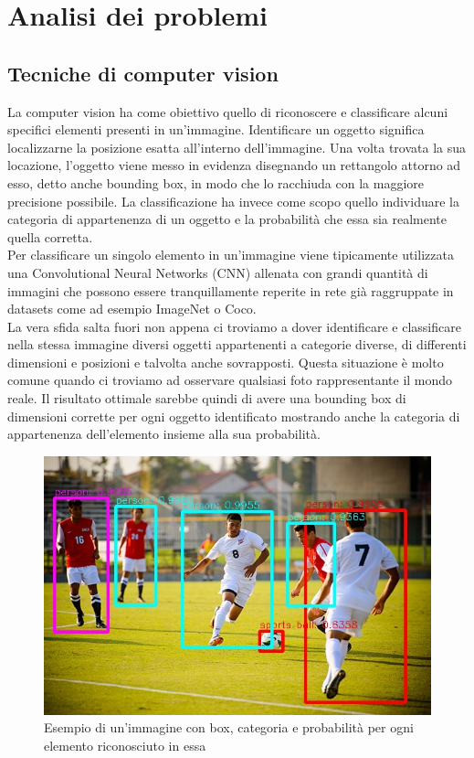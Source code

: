 \section{Analisi dei problemi}
\subsection{Tecniche di computer vision}
La computer vision ha come obiettivo quello di riconoscere e classificare alcuni specifici elementi presenti in un'immagine. Identificare un oggetto significa localizzarne la posizione esatta all'interno dell'immagine. Una volta trovata la sua locazione, l'oggetto viene messo in evidenza disegnando un rettangolo attorno ad esso, detto anche bounding box, in modo che lo racchiuda con la maggiore precisione possibile. La classificazione ha invece come scopo quello individuare la categoria di appartenenza di un oggetto e la probabilità che essa sia realmente quella corretta.\\
Per classificare un singolo elemento in un'immagine viene tipicamente utilizzata una Convolutional Neural Networks (CNN) allenata con grandi quantità di immagini che possono essere tranquillamente reperite in rete già raggruppate in datasets come ad esempio ImageNet o Coco.\\
La vera sfida salta fuori non appena ci troviamo a dover identificare e classificare nella stessa immagine diversi oggetti appartenenti a categorie diverse, di differenti dimensioni e posizioni e talvolta anche sovrapposti. Questa situazione è molto comune quando ci troviamo ad osservare qualsiasi foto rappresentante il mondo reale. Il risultato ottimale sarebbe quindi di avere una bounding box di dimensioni corrette per ogni oggetto identificato mostrando anche la categoria di appartenenza dell'elemento insieme alla sua probabilità.
\begin{figure}[H]
	\centering
	\includegraphics[width=0.7\linewidth]{images/esempio-detection.jpg}
	\caption{Esempio di un'immagine con box, categoria e probabilità per ogni elemento riconosciuto in essa}
	\label{Esempio di un frame di un video in 4K}
\end{figure}
